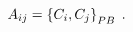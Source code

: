 \begin{equation}
A_{ij}=\left\{  C_{i},C_{j}\right\}  _{{\footnotesize PB}}\;. \label{CMatrix}%
\end{equation}

